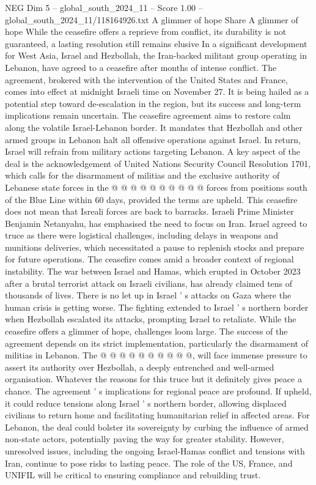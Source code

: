 \begin{textsample}{NEG Dim 5 – global\_south\_2024\_11 – Score 1.00 – global\_south\_2024\_11/118164926.txt}  \label{ex:f5_neg_434}
A glimmer of hope Share A glimmer of hope While the ceasefire offers a reprieve from conflict, its durability is not guaranteed, a lasting resolution still remains elusive In a significant development for West Asia, Israel and Hezbollah, the Iran-backed militant group operating in Lebanon, have agreed to a ceasefire after months of intense conflict.
The agreement, brokered with the intervention of the United States and France, comes into effect at midnight Israeli time on November 27.
It is being hailed as a potential step toward de-escalation in the region, but its success and long-term implications remain uncertain.
The ceasefire agreement aims to restore calm along the volatile Israel-Lebanon border.
It mandates that Hezbollah and other armed groups in Lebanon halt all offensive operations against Israel.
In return, Israel will refrain from military actions targeting Lebanon.
A key aspect of the deal is the acknowledgement of United Nations Security Council Resolution 1701, which calls for the disarmament of militias and the exclusive authority of Lebanese state forces in the @ @ @ @ @ @ @ @ @ @ forces from positions south of the Blue Line within 60 days, provided the terms are upheld.
This ceasefire does not mean that Isreali forces are back to barracks.
Israeli Prime Minister Benjamin Netanyahu, has emphasised the need to focus on Iran.
Israel agreed to truce as there were logistical challenges, including delays in weapons and munitions deliveries, which necessitated a pause to replenish stocks and prepare for future operations.
The ceasefire comes amid a broader context of regional instability.
The war between Israel and Hamas, which erupted in October 2023 after a brutal terrorist attack on Israeli civilians, has already claimed tens of thousands of lives.
There is no let up in Israel ' s attacks on Gaza where the human crisis is getting worse.
The fighting extended to Israel ' s northern border when Hezbollah escalated its attacks, prompting Israel to retaliate.
While the ceasefire offers a glimmer of hope, challenges loom large.
The success of the agreement depends on its strict implementation, particularly the disarmament of militias in Lebanon.
The @ @ @ @ @ @ @ @ @ @, will face immense pressure to assert its authority over Hezbollah, a deeply entrenched and well-armed organisation.
Whatever the reasons for this truce but it definitely gives peace a chance.
The agreement ' s implications for regional peace are profound.
If upheld, it could reduce tensions along Israel ' s northern border, allowing displaced civilians to return home and facilitating humanitarian relief in affected areas.
For Lebanon, the deal could bolster its sovereignty by curbing the influence of armed non-state actors, potentially paving the way for greater stability.
However, unresolved issues, including the ongoing Israel-Hamas conflict and tensions with Iran, continue to pose risks to lasting peace.
The role of the US, France, and UNIFIL will be critical to ensuring compliance and rebuilding trust.

\end{textsample}
